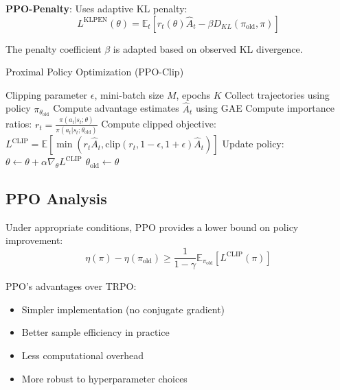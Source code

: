 \textbf{PPO-Penalty}: Uses adaptive KL penalty:
\begin{equation}
L^{\text{KLPEN}}(\theta) = \mathbb{E}_t \left[ r_t(\theta) \hat{A}_t - \beta D_{KL}(\pi_{\text{old}}, \pi) \right]
\end{equation}

The penalty coefficient $\beta$ is adapted based on observed KL divergence.

\begin{algorithm}
\caption{Proximal Policy Optimization (PPO-Clip)}
\begin{algorithmic}
\REQUIRE Clipping parameter $\epsilon$, mini-batch size $M$, epochs $K$
    \STATE Collect trajectories using policy $\pi_{\theta_{\text{old}}}$
    \STATE Compute advantage estimates $\hat{A}_t$ using GAE
            \STATE Compute importance ratios: $r_t = \frac{\pi(a_t|s_t; \theta)}{\pi(a_t|s_t; \theta_{\text{old}})}$
            \STATE Compute clipped objective: $L^{\text{CLIP}} = \mathbb{E} [\min(r_t \hat{A}_t, \text{clip}(r_t, 1-\epsilon, 1+\epsilon) \hat{A}_t)]$
            \STATE Update policy: $\theta \leftarrow \theta + \alpha \nabla_\theta L^{\text{CLIP}}$
        \ENDFOR
    \ENDFOR
    \STATE $\theta_{\text{old}} \leftarrow \theta$
\ENDFOR
\end{algorithmic}
\end{algorithm}

\subsection{PPO Analysis}

\begin{theorem}
Under appropriate conditions, PPO provides a lower bound on policy improvement:
\begin{equation}
\eta(\pi) - \eta(\pi_{\text{old}}) \geq \frac{1}{1-\gamma} \mathbb{E}_{\pi_{\text{old}}} [L^{\text{CLIP}}(\pi)]
\end{equation}
\end{theorem}

PPO's advantages over TRPO:
\begin{itemize}
    \item Simpler implementation (no conjugate gradient)
    \item Better sample efficiency in practice
    \item Less computational overhead
    \item More robust to hyperparameter choices
\end{itemize}

